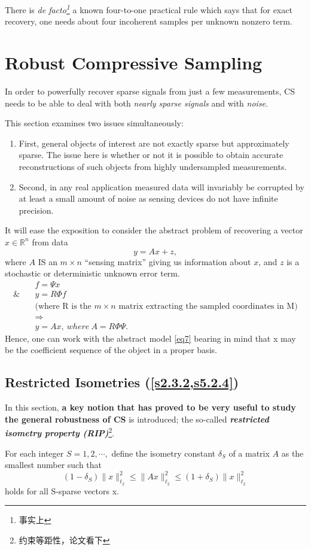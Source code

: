 There is \emph{de facto\footnote{事实上}} a known four-to-one practical rule which says that for exact recovery, one needs about four incoherent samples per unknown nonzero term.
\section{Robust Compressive Sampling}
In order to powerfully recover sparse signals from just a few measurements, CS needs to be able to deal with both \emph{nearly sparse signals} and with \emph{noise}. 

This section examines two issues simultaneously:
\begin{enumerate}
	\item First, general objects of interest are not exactly sparse but approximately sparse. The issue here is whether or not it is possible to obtain accurate reconstructions of such objects from highly undersampled measurements.
	\item Second, in any real application measured data will invariably be corrupted by at least a small amount of noise as sensing devices do not have infinite precision. 
\end{enumerate}

It will ease the exposition to consider the abstract problem of recovering a vector $x \in \mathbb{R}^n$ from data
\begin{equation}
\label{eq7}
y=Ax+z,
\end{equation}
where $A$ IS an $m \times n$ ``sensing matrix'' giving us information about $x$, and $z$ is a stochastic or deterministic unknown error term. 
\begin{eqnarray*}
 & f = \Psi x  \\
 \& \quad & y = R\Phi f \\
 & \text{(where R is the $m \times n$ matrix extracting the sampled coordinates in M)} \\
 & \Longrightarrow \\
 & y=Ax,\ where\ A=R\Phi\Psi.
\end{eqnarray*}
Hence, one can work with the abstract model \cref{eq7} bearing in mind that x may be the coefficient sequence of the object in a proper basis.

\subsection{Restricted Isometries (\cref{s2.3.2,s5.2.4})}
\label{s1.3.1}
In this section, \textbf{a key notion that has proved to be very useful to study the general robustness of CS} is  introduced; the so-called \emph{\textcolor[rgb]{1,0,0}{\textbf{restricted isometry property (RIP)\label{RIP}}}}\footnote{约束等距性，论文\cite{15}看下}\cite{15}.
\begin{definition}
	\label{def2}
	For each integer $S=1,2,\cdots,$ define the isometry constant $\delta_S$ of a matrix $A$ as the smallest number such that
	\begin{equation}
	\label{eq8}
	(1-\delta_S)\|x\|_{\ell_2}^2 \leq \|Ax\|_{\ell_2}^2 \leq (1+\delta_S)\|x\|_{\ell_2}^2
	\end{equation}
	holds for all S-sparse vectors x.
\end{definition}


